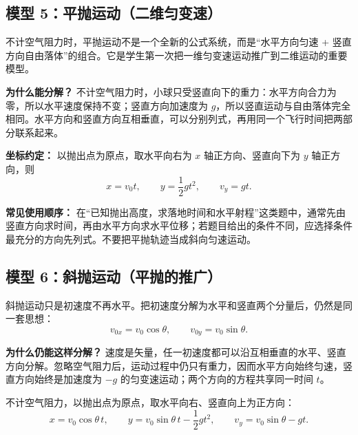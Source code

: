 \subsection*{模型 5：平抛运动（二维匀变速）}

不计空气阻力时，平抛运动不是一个全新的公式系统，而是“水平方向匀速 + 竖直方向自由落体”的组合。它是学生第一次把一维匀变速运动推广到二维运动的重要模型。

\textbf{为什么能分解？} 不计空气阻力时，小球只受竖直向下的重力：水平方向合力为零，所以水平速度保持不变；竖直方向加速度为 $g$，所以竖直运动与自由落体完全相同。水平方向和竖直方向互相垂直，可以分别列式，再用同一个飞行时间把两部分联系起来。

\begin{center}


\label{fig:projectile-motion}
\end{center}

\textbf{坐标约定：} 以抛出点为原点，取水平向右为 $x$ 轴正方向、竖直向下为 $y$ 轴正方向，则
\[
x=v_0t,\qquad y=\frac12gt^2,\qquad v_y=gt.
\]

\textbf{常见使用顺序：} 在“已知抛出高度，求落地时间和水平射程”这类题中，通常先由竖直方向求时间，再由水平方向求水平位移；若题目给出的条件不同，应选择条件最充分的方向先列式。不要把平抛轨迹当成斜向匀速运动。

\subsection*{模型 6：斜抛运动（平抛的推广）}

斜抛运动只是初速度不再水平。把初速度分解为水平和竖直两个分量后，仍然是同一套思想：
\[
v_{0x}=v_0\cos\theta,\qquad v_{0y}=v_0\sin\theta.
\]

\textbf{为什么仍能这样分解？} 速度是矢量，任一初速度都可以沿互相垂直的水平、竖直方向分解。忽略空气阻力后，运动过程中仍只有重力，因而水平方向始终匀速，竖直方向始终是加速度为 $-g$ 的匀变速运动；两个方向的方程共享同一时间 $t$。

\begin{center}


\label{fig:oblique-projectile-motion}
\end{center}

不计空气阻力，以抛出点为原点，取水平向右、竖直向上为正方向：
\[
x=v_0\cos\theta\, t,\qquad
y=v_0\sin\theta\, t-\frac12gt^2,\qquad
v_y=v_0\sin\theta-gt.
\]

